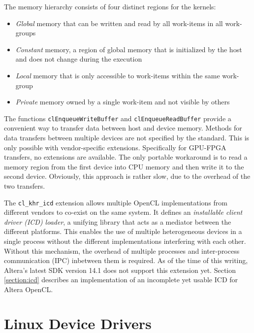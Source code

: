The memory hierarchy consists of four distinct regions for the kernels:
\begin{itemize}
	\item \emph{Global} memory that can be written and read by all work-items in all work-groups
	\item \emph{Constant} memory, a region of global memory that is initialized by the host and does not change during the execution
	\item \emph{Local} memory that is only accessible to work-items within the same work-group
	\item \emph{Private} memory owned by a single work-item and not visible by others
\end{itemize}

The functions \texttt{clEnqueueWriteBuffer} and \texttt{clEnqueueReadBuffer} provide a convenient way to transfer data between host and device memory.
Methods for data transfers between multiple devices are not specified by the standard.
This is only possible with vendor-specific extensions.
Specifically for GPU-FPGA transfers, no extensions are available.
The only portable workaround is to read a memory region from the first device into CPU memory and then write it to the second device.
Obviously, this approach is rather slow, due to the overhead of the two transfers.




The \texttt{cl\_khr\_icd} extension\cite{icd} allows multiple OpenCL implementations from different vendors to co-exist on the same system.
It defines an \emph{installable client driver (ICD) loader}, a unifying library that acts as a mediator between the different platforms.
This enables the use of multiple heterogeneous devices in a single process without the different implementations interfering with each other.
Without this mechanism, the overhead of multiple processes and inter-process communication (IPC) inbetween them is required.
As of the time of this writing, Altera's latest SDK version 14.1 does not support this extension yet.
Section \ref{section:icd} describes an implementation of an incomplete yet usable ICD for Altera OpenCL.



%




\section{Linux Device Drivers}
\label{section:drivers}

